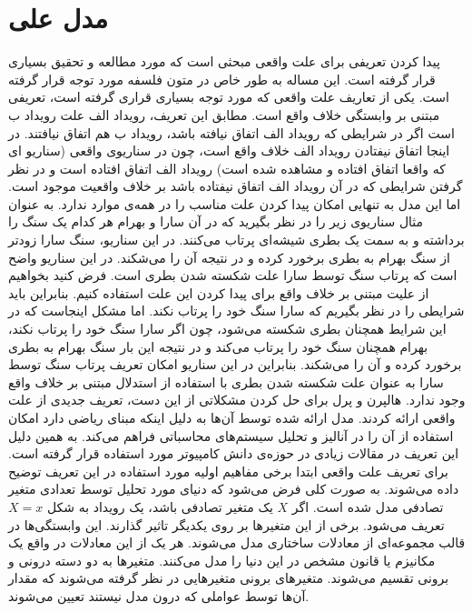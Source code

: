 \section{مدل علی}
پیدا کردن تعریفی برای علت واقعی
مبحثی است که مورد مطالعه و تحقیق بسیاری قرار گرفته است.
این مساله به طور خاص در متون فلسفه مورد توجه قرار گرفته است.
یکی از تعاریف علت واقعی که مورد توجه بسیاری قراری گرفته است، تعریفی مبتنی بر وابستگی خلاف واقع
است.
مطابق این تعریف، رویداد الف علت رویداد ب است اگر در شرایطی که رویداد الف اتفاق نیافته باشد، رویداد ب هم اتفاق نیافتند.
در اینجا اتفاق نیفتادن رویداد الف خلاف واقع است، چون در سناریوی واقعی
(سناریو ای که واقعا اتفاق افتاده و مشاهده شده است)
رویداد الف اتفاق افتاده است و در نظر گرفتن شرایطی که در آن رویداد الف اتفاق نیفتاده باشد بر خلاف واقعیت موجود است.
اما این مدل به تنهایی امکان پیدا کردن علت مناسب را در همه‌ی موارد ندارد.
به عنوان مثال سناریوی زیر را در نظر بگیرید که در آن سارا و بهرام هر کدام یک سنگ را برداشته و به سمت یک بطری شیشه‌ای پرتاب می‌کنند.
در این سناریو، سنگ سارا زودتر از سنگ بهرام به بطری برخورد کرده و در نتیجه آن را می‌شکند.
در این سناریو واضح است که پرتاب سنگ توسط سارا علت شکسته شدن بطری است.
فرض کنید بخواهیم از علیت مبتنی بر خلاف واقع برای پیدا کردن این علت استفاده کنیم.
بنابراین باید شرایطی را در نظر بگیریم که سارا سنگ خود را پرتاب نکند.
اما مشکل اینجاست که در این شرایط همچنان بطری شکسته می‌شود، چون اگر سارا سنگ خود را پرتاب نکند، بهرام همچنان سنگ خود را پرتاب می‌کند و در نتیجه این بار سنگ بهرام به بطری برخورد کرده و آن را می‌شکند.
بنابراین در این سناریو امکان تعریف پرتاب سنگ توسط سارا به عنوان علت شکسته شدن بطری با استفاده از استدلال مبتنی بر خلاف واقع وجود ندارد.
هالپرن
و پرل
برای حل کردن مشکلاتی از این دست، تعریف جدیدی از علت واقعی
\cite{hp}
ارائه کردند.
مدل ارائه شده توسط آن‌ها به دلیل اینکه مبنای ریاضی دارد امکان استفاده از آن را در آنالیز و تحلیل سیستم‌های محاسباتی فراهم می‌کند.
به همین دلیل این تعریف در مقالات زیادی در حوزه‌ی دانش کامپیوتر مورد استفاده قرار گرفته است.
برای تعریف علت واقعی ابتدا برخی مفاهیم اولیه مورد استفاده در این تعریف توضیح داده می‌شوند.
به صورت کلی فرض می‌شود که دنیای مورد تحلیل توسط تعدادی متغیر تصادفی مدل شده است.
اگر
$X$
یک متغیر تصادفی باشد، یک رویداد به شکل
$X=x$
تعریف می‌شود.
برخی از این متغیر‌ها بر روی یکدیگر تاثیر گذارند.
این وابستگی‌ها در قالب مجموعه‌ای از معادلات ساختاری
مدل می‌شوند.
هر یک از این معادلات در واقع یک مکانیزم یا قانون مشخص در این دنیا را مدل می‌کنند.
متغیرها به دو دسته درونی
و برونی
تقسیم می‌شوند.
متغیر‌های برونی متغیر‌هایی در نظر گرفته می‌شوند که مقدار آن‌ها توسط عواملی که درون مدل نیستند تعیین می‌شوند.
